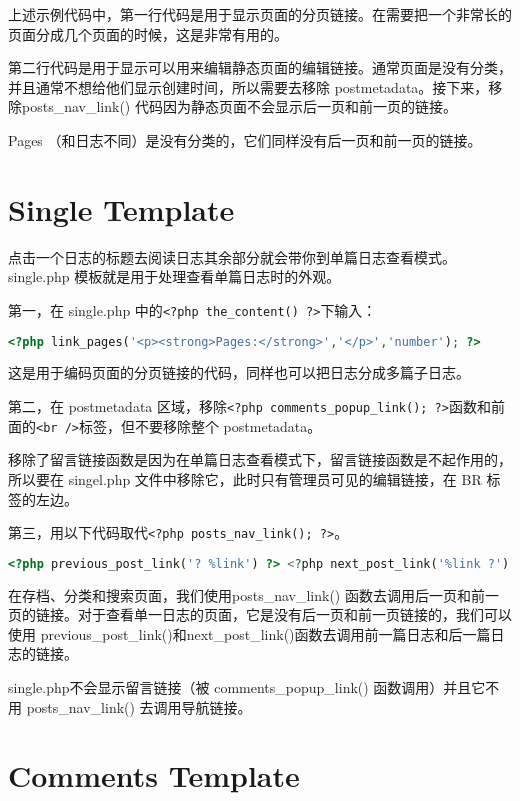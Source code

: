 上述示例代码中，第一行代码是用于显示页面的分页链接。在需要把一个非常长的页面分成几个页面的时候，这是非常有用的。

第二行代码是用于显示可以用来编辑静态页面的编辑链接。通常页面是没有分类，并且通常不想给他们显示创建时间，所以需要去移除 postmetadata。接下来，移除posts\_nav\_link() 代码因为静态页面不会显示后一页和前一页的链接。

Pages （和日志不同）是没有分类的，它们同样没有后一页和前一页的链接。

\section{Single Template}

点击一个日志的标题去阅读日志其余部分就会带你到单篇日志查看模式。single.php 模板就是用于处理查看单篇日志时的外观。

第一，在 single.php 中的\texttt{<?php the\_content() ?>}下输入：


\begin{lstlisting}[language=PHP]
<?php link_pages('<p><strong>Pages:</strong>','</p>','number'); ?>
\end{lstlisting}

这是用于编码页面的分页链接的代码，同样也可以把日志分成多篇子日志。


第二，在 postmetadata 区域，移除\texttt{<?php comments\_popup\_link(); ?>}函数和前面的\texttt{<br />}标签，但不要移除整个 postmetadata。

移除了留言链接函数是因为在单篇日志查看模式下，留言链接函数是不起作用的，所以要在 singel.php 文件中移除它，此时只有管理员可见的编辑链接，在 BR 标签的左边。

第三，用以下代码取代\texttt{<?php posts\_nav\_link(); ?>}。


\begin{lstlisting}[language=PHP]
<?php previous_post_link('? %link') ?> <?php next_post_link('%link ?') ?>
\end{lstlisting}

在存档、分类和搜索页面，我们使用posts\_nav\_link() 函数去调用后一页和前一页的链接。对于查看单一日志的页面，它是没有后一页和前一页链接的，我们可以使用 previous\_post\_link()和next\_post\_link()函数去调用前一篇日志和后一篇日志的链接。

single.php不会显示留言链接（被 comments\_popup\_link() 函数调用）并且它不用 posts\_nav\_link() 去调用导航链接。


\section{Comments Template}


